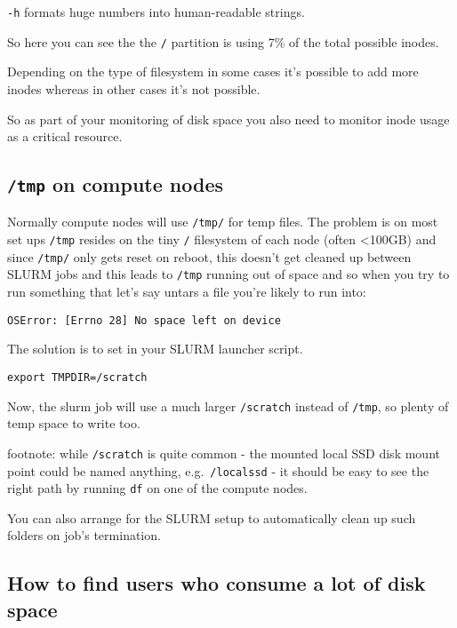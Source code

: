 \documentclass[
]{report}
\begin{document}
\texttt{-h} formats huge numbers into human-readable strings.

So here you can see the the \texttt{/} partition is using 7\% of the
total possible inodes.

Depending on the type of filesystem in some cases it's possible to add
more inodes whereas in other cases it's not possible.

So as part of your monitoring of disk space you also need to monitor
inode usage as a critical resource.

\subsection{\texorpdfstring{\texttt{/tmp} on compute
nodes}{/tmp on compute nodes}}\label{tmp-on-compute-nodes}

Normally compute nodes will use \texttt{/tmp/} for temp files. The
problem is on most set ups \texttt{/tmp} resides on the tiny \texttt{/}
filesystem of each node (often \textless100GB) and since \texttt{/tmp/}
only gets reset on reboot, this doesn't get cleaned up between SLURM
jobs and this leads to \texttt{/tmp} running out of space and so when
you try to run something that let's say untars a file you're likely to
run into:

\begin{verbatim}
OSError: [Errno 28] No space left on device
\end{verbatim}

The solution is to set in your SLURM launcher script.

\begin{verbatim}
export TMPDIR=/scratch
\end{verbatim}

Now, the slurm job will use a much larger \texttt{/scratch} instead of
\texttt{/tmp}, so plenty of temp space to write too.

footnote: while \texttt{/scratch} is quite common - the mounted local
SSD disk mount point could be named anything, e.g.~\texttt{/localssd} -
it should be easy to see the right path by running \texttt{df} on one of
the compute nodes.

You can also arrange for the SLURM setup to automatically clean up such
folders on job's termination.

\subsection{How to find users who consume a lot of disk
space}\label{how-to-find-users-who-consume-a-lot-of-disk-space}
\end{document}
